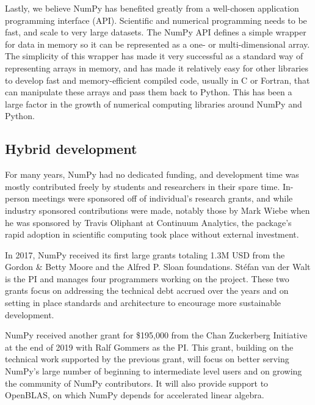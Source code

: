 Lastly, we believe NumPy has benefited greatly from a well-chosen application
programming interface (API).  Scientific and numerical programming needs to be
fast, and scale to very large datasets.  The NumPy API defines a simple wrapper
for data in memory so it can be represented as a one- or multi-dimensional
array.  The simplicity of this wrapper has made it very successful as a
standard way of representing arrays in memory, and has made it relatively easy
for other libraries to develop fast and memory-efficient compiled code, usually
in C or Fortran, that can manipulate these arrays and pass them back to Python.
This has been a large factor in the growth of numerical computing libraries
around NumPy and Python.



\subsection{Hybrid development}

For many years, NumPy had no dedicated funding, and development time
was mostly contributed freely by students and researchers in their
spare time.  In-person meetings were sponsored off of individual's
research grants, and while industry sponsored contributions were made,
notably those by Mark Wiebe when he was sponsored by Travis Oliphant
at Continuum Analytics, the package's rapid adoption in scientific
computing took place without external investment.

In 2017, NumPy received its first large grants totaling 1.3M USD from the
Gordon \& Betty Moore and the Alfred P. Sloan foundations.
Stéfan van der Walt is the PI and manages four programmers working on the project.
These two grants focus on addressing the technical debt accrued over the years and
on setting in place standards and architecture to encourage more sustainable development.

NumPy received another grant for \$195,000 from the Chan Zuckerberg
Initiative at the end of 2019 with Ralf Gommers as the PI.
This grant, building on the technical work supported by the previous
grant, will focus on better serving NumPy's large number of beginning
to intermediate level users and on growing the community of NumPy
contributors.
It will also provide support to OpenBLAS, on which NumPy depends for
accelerated linear algebra.

